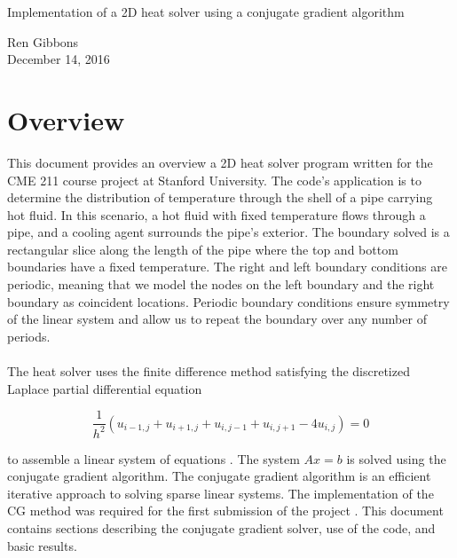 \documentclass[12pt]{article}
\begin{document}
  \begin{center}
    \begin{large}
      Implementation of a 2D heat solver using a conjugate gradient algorithm \\
    \end{large}
    \vspace{0.1in}
    Ren Gibbons \\
    December 14, 2016
  \end{center}

\section{Overview}
  This document provides an overview a 2D heat solver program written for the CME 211 course project at Stanford University. The code's application is to determine the distribution of temperature through the shell of a pipe carrying hot fluid. In this scenario, a hot fluid with fixed temperature flows through a pipe, and a cooling agent surrounds the pipe's exterior. The boundary solved is a rectangular slice along the length of the pipe where the top and bottom boundaries have a fixed temperature. The right and left boundary conditions are periodic, meaning that we model the nodes on the left boundary and the right boundary as coincident locations. Periodic boundary conditions ensure symmetry of the linear system and allow us to repeat the boundary over any number of periods. \\\\
  The heat solver uses the finite difference method satisfying the discretized Laplace partial differential equation 
  
  \begin{equation*}
  \frac{1}{h^2}(u_{i-1,j}+u_{i+1,j}+u_{i,j-1}+u_{i,j+1}-4u_{i,j}) = 0
  \end{equation*}
  
  \noindent
  to assemble a linear system of equations \cite{part2}. The system $Ax=b$ is solved using the conjugate gradient algorithm. The conjugate gradient algorithm is an efficient iterative approach to solving sparse linear systems. The implementation of the CG method was required for the first submission of the project \cite{part1}. This document contains sections describing the conjugate gradient solver, use of the code, and basic results.
  
\end{document}
